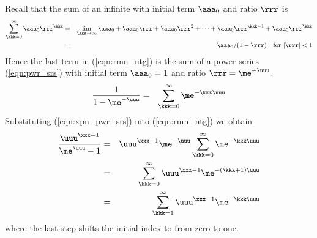 \documentclass[12pt]{article}
\begin{document}
Recall that the sum of an infinite  with 
initial term $\aaa_{0}$ and ratio $\rrr$ is
\begin{eqnarray}
\sum_{\kkk=0}^{\infty} \aaa_{0}\rrr^{\kkk} & = & 
\lim_{\kkk \to \infty} \aaa_{0} + \aaa_{0}\rrr + \aaa_{0}\rrr^{2} + \cdots
+ \aaa_{0}\rrr^{\kkk-1} + \aaa_{0}\rrr^{\kkk} \nonumber \\
& = & \aaa_{0}/(1-\rrr) 
\quad \mbox{for\ } |\rrr| < 1
\label{eqn:pwr_srs}
\end{eqnarray}
Hence the last term in (\ref{eqn:rmn_ntg}) is the sum of a power
series (\ref{eqn:pwr_srs}) with initial term $\aaa_{0} = 1$ and 
ratio $\rrr = \me^{-\uuu}$.
\begin{eqnarray}
\frac{1}{1-\me^{-\uuu}}
& = & \sum_{\kkk=0}^{\infty} \me^{-\kkk\uuu}
\label{eqn:xpn_pwr_srs}
\end{eqnarray}
Substituting (\ref{eqn:xpn_pwr_srs}) into (\ref{eqn:rmn_ntg}) 
we obtain
\begin{eqnarray}
\frac{\uuu^{\xxx-1}}{\me^{\uuu}-1} 
& = & \uuu^{\xxx-1}\me^{-\uuu} \sum_{\kkk=0}^{\infty} \me^{-\kkk\uuu} \nonumber \\
& = & \sum_{\kkk=0}^{\infty} \uuu^{\xxx-1} \me^{-(\kkk+1)\uuu} \nonumber \\
& = & \sum_{\kkk=1}^{\infty} \uuu^{\xxx-1} \me^{-\kkk\uuu}
\label{eqn:rmn_ntg_pwr_srs}
\end{eqnarray}
where the last step shifts the initial index to from zero to one.
\end{document}
